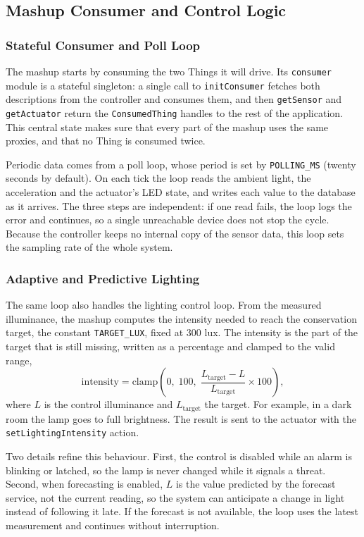 \documentclass[conference]{IEEEtran}
\begin{document}
\subsection{Mashup Consumer and Control Logic}

\subsubsection{Stateful Consumer and Poll Loop}
The mashup starts by consuming the two Things it will drive. Its \texttt{consumer} module is a stateful singleton: a single call to \texttt{initConsumer} fetches both descriptions from the controller and consumes them, and then \texttt{getSensor} and \texttt{getActuator} return the \texttt{ConsumedThing} handles to the rest of the application. This central state makes sure that every part of the mashup uses the same proxies, and that no Thing is consumed twice.

Periodic data comes from a poll loop, whose period is set by \texttt{POLLING\_MS} (twenty seconds by default). On each tick the loop reads the ambient light, the acceleration and the actuator's LED state, and writes each value to the database as it arrives. The three steps are independent: if one read fails, the loop logs the error and continues, so a single unreachable device does not stop the cycle. Because the controller keeps no internal copy of the sensor data, this loop sets the sampling rate of the whole system.

\subsubsection{Adaptive and Predictive Lighting}
The same loop also handles the lighting control loop. From the measured illuminance, the mashup computes the intensity needed to reach the conservation target, the constant \texttt{TARGET\_LUX}, fixed at $300$ lux. The intensity is the part of the target that is still missing, written as a percentage and clamped to the valid range,
\[
  \text{intensity} = \mathrm{clamp}\!\left(0,\;100,\;\frac{L_{\mathrm{target}} - L}{L_{\mathrm{target}}}\times 100\right),
\]
where $L$ is the control illuminance and $L_{\mathrm{target}}$ the target. For example, in a dark room the lamp goes to full brightness. The result is sent to the actuator with the \texttt{setLightingIntensity} action.

Two details refine this behaviour. First, the control is disabled while an alarm is blinking or latched, so the lamp is never changed while it signals a threat. Second, when forecasting is enabled, $L$ is the value predicted by the forecast service, not the current reading, so the system can anticipate a change in light instead of following it late. If the forecast is not available, the loop uses the latest measurement and continues without interruption.
\end{document}
